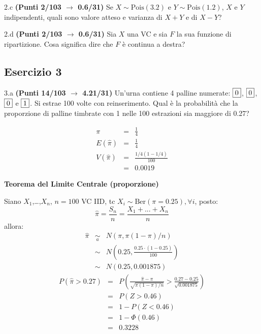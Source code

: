 \documentclass[
  11pt,
]{book}
\theoremstyle{mytheoremstyle}
\theoremstyle{mydefstyle}
\newenvironment{sol}
  {
  \begin{tcolorbox}[enhanced,breakable,arc=0.1mm,boxrule=1pt,colback=white,colframe=iblue,
  title=\bf \fontfamily{lmss}\selectfont \hspace{.5 cm} Soluzione,drop fuzzy shadow]

}{
\end{tcolorbox}
  }
\begin{document}
2.c \textbf{(Punti 2/103 \(\rightarrow\) 0.6/31)} Se \(X\sim\text{Pois}(3.2)\) e \(Y\sim\text{Pois}(1.2)\), \(X\) e \(Y\) indipendenti, quali sono valore atteso e varianza di \(X+Y\) e di \(X-Y\)?

2.d \textbf{(Punti 2/103 \(\rightarrow\) 0.6/31)} Sia \(X\) una VC e sia \(F\) la sua funzione di ripartizione. Cosa significa dire che \(F\) è continua a destra?

\subsection{Esercizio 3}\label{esercizio-3-19}

3.a \textbf{(Punti 14/103 \(\rightarrow\) 4.21/31)} Un'urna contiene 4 palline numerate: \(\fbox{0}\), \(\fbox{0}\), \(\fbox{0}\) e \(\fbox{1}\). Si estrae 100 volte con reinserimento. Qual è la probabilità che la proporzione di palline timbrate con 1 nelle 100 estrazioni sia maggiore di 0.27?

\begin{sol}
\begin{eqnarray*}
  \pi &=&  \frac 14\\
  E(\hat\pi) &=& \frac 14\\
  V(\hat\pi) &=& \frac {1/4(1-1/4)}{100}\\
  &=& 0.0019
\end{eqnarray*}

\textbf{Teorema del Limite Centrale (proporzione)}

Siano \(X_1\),\ldots,\(X_n\), \(n=100\) VC IID, tc \(X_i\sim\text{Ber}(\pi=0.25)\)\(,\forall i\), posto:
\[
      \hat\pi=\frac{S_n}n = \frac{X_1 + ... + X_n}n
      \]
allora:\begin{eqnarray*}
  \hat\pi & \mathop{\sim}\limits_{a}& N(\pi,\pi(1-\pi)/n) \\
  &\sim & N\left(0.25,\frac{0.25\cdot(1-0.25)}{100}\right) \\
     &\sim & N(0.25,0.001875) 
  \end{eqnarray*}\begin{eqnarray*}
      P( \hat\pi   >   0.27 ) 
        &=& P\left(  \frac { \hat\pi  -  \pi }{ \sqrt{\pi(1-\pi)/n} }  >  \frac { 0.27  -  0.25 }{\sqrt{ 0.001875 }} \right)  \\
                 &=& P\left(  Z   >   0.46 \right) \\    &=& 1-P(Z< 0.46 )\\ 
                 &=&  1-\Phi( 0.46 ) \\ &=&  0.3228 
      \end{eqnarray*}

\end{sol}
\end{document}
